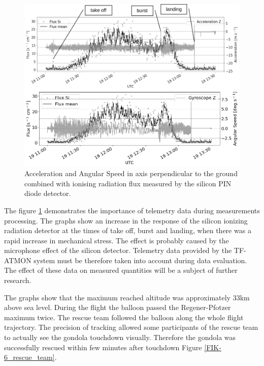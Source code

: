 \documentclass{Rpd}
\begin{document}
\begin{figure}%
	\centerline{\includegraphics[width=\columnwidth]{img/FIK-6_metadada.png}}
	\caption{Acceleration and Angular Speed in axis perpendicular to the ground combined with ionising radiation flux measured by the silicon PIN diode detector. \label{FIK-6_telemetry}}
\end{figure}

The figure \ref{FIK-6_telemetry} demonstrates the importance of telemetry data during measurements processing. The graphs show an increase in the response of the silicon ionizing radiation detector at the times of take off, burst and landing, when there was a rapid increase in mechanical stress. The effect is probably caused by the microphone effect of the silicon detector. Telemetry data provided by the TF-ATMON system must be therefore taken into account during data evaluation. The effect of these data on measured quantities will be a subject of further research. 


The graphs show that the maximum reached altitude was approximately 33km above sea level. During the flight the balloon passed the Regener-Pfotzer maximum twice. The rescue team followed the balloon along the whole flight trajectory. The precision of tracking allowed some participants of the rescue team to actually see the gondola touchdown visually. Therefore the gondola was successfully rescued within few minutes after touchdown Figure \ref{FIK-6_rescue_team}.
\end{document}

